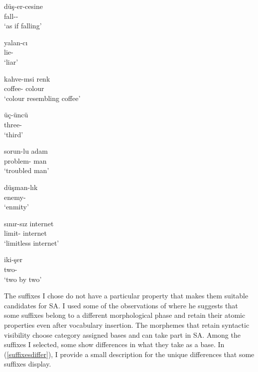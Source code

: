 \begin{exe}
  \begin{multicols}{2}
    \ex \label{derivationalsuffixes}
    \begin{xlist}
        \ex \gll düş-er-cesine \\ 
        fall-{\Aor}-{\Der} \\
        \glt `as if falling'
        
        \ex \gll yalan-cı \\ 
        lie-{\Der} \\ 
        \glt `liar'
        
        \ex \gll kahve-msi renk \\ 
        coffee-{\Der} colour \\
        \glt `colour resembling coffee'

        \ex \gll üç-üncü \\ 
        three-{\Der} \\
        \glt `third'

        \ex \gll sorun-lu adam \\ 
        problem-{\Der} man \\
        \glt `troubled man'
        
        \ex \gll düşman-lık \\ 
        enemy-{\Der} \\
        \glt `enmity'
        
        \ex \gll sınır-sız internet \\ 
        limit-{\Der} internet \\
        \glt `limitless internet'
        
        \ex \gll iki-şer \\ two-{\Der} \\
        \glt `two by two'
    \end{xlist}
    \end{multicols}
\end{exe}

The suffixes I chose do not have a particular property that makes them suitable candidates for SA. I used some of the observations of \cite{yoon2017lexical} where he suggests that some suffixes belong to a different morphological phase and retain their atomic properties even after vocabulary insertion. The morphemes that retain syntactic visibility choose category assigned bases and can take part in SA. Among the suffixes I selected, some show differences in what they take as a base. In (\ref{suffixesdiffer}), I provide a small description for the unique differences that some suffixes display.

